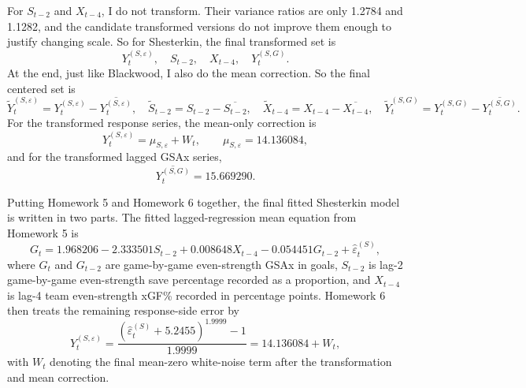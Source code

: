 \documentclass[
  10pt,
]{extarticle}
\begin{document}
For \(S_{t-2}\) and \(X_{t-4}\), I do not transform. Their variance ratios are only 1.2784 and 1.1282, and the candidate transformed versions do not improve them enough to justify changing scale. So for Shesterkin, the final transformed set is
\[
Y^{(S,\varepsilon)}_t,\quad S_{t-2},\quad X_{t-4},\quad Y^{(S,G)}_t.
\]
At the end, just like Blackwood, I also do the mean correction. So the final centered set is
\[
\widetilde{Y}^{(S,\varepsilon)}_t = Y^{(S,\varepsilon)}_t - \overline{Y^{(S,\varepsilon)}_t},
\quad
\widetilde{S}_{t-2} = S_{t-2} - \overline{S_{t-2}},
\quad
\widetilde{X}_{t-4} = X_{t-4} - \overline{X_{t-4}},
\quad
\widetilde{Y}^{(S,G)}_t = Y^{(S,G)}_t - \overline{Y^{(S,G)}_t}.
\]
For the transformed response series, the mean-only correction is
\[
Y^{(S,\varepsilon)}_t = \mu_{S,\varepsilon} + W_t,
\qquad
\mu_{S,\varepsilon} = 14.136084,
\]
and for the transformed lagged GSAx series,
\[
\overline{Y^{(S,G)}_t} = 15.669290.
\]

Putting Homework 5 and Homework 6 together, the final fitted Shesterkin model is written in two parts. The fitted lagged-regression mean equation from Homework 5 is
\[
G_t = 1.968206
 -  2.333501 S_{t-2}
 +  0.008648 X_{t-4}
 -  0.054451 G_{t-2}
 + \widehat{\varepsilon}^{(S)}_t,
\]
where \(G_t\) and \(G_{t-2}\) are game-by-game even-strength GSAx in goals, \(S_{t-2}\) is lag-2 game-by-game even-strength save percentage recorded as a proportion, and \(X_{t-4}\) is lag-4 team even-strength xGF\% recorded in percentage points. Homework 6 then treats the remaining response-side error by
\[
Y^{(S,\varepsilon)}_t
= \frac{\left(\widehat{\varepsilon}^{(S)}_t + 5.2455\right)^{1.9999} - 1}{1.9999}
= 14.136084 + W_t,
\]
with \(W_t\) denoting the final mean-zero white-noise term after the transformation and mean correction.
\end{document}
